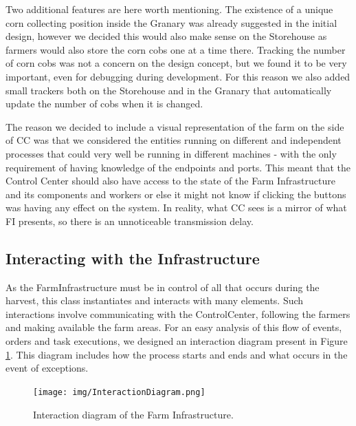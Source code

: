 \documentclass[12pt]{article}
\begin{document}
Two additional features are here worth mentioning.
The existence of a unique corn collecting position inside the Granary was already suggested in the initial design, however we decided this would also make sense
on the Storehouse as farmers would also store the corn cobs one at a time there.
Tracking the number of corn cobs was not a concern on the design concept, but we found it to be very important, even for debugging during development.
For this reason we also added small trackers both on the Storehouse and in the Granary that automatically update the number of cobs when it is changed.

The reason we decided to include a visual representation of the farm on the side of CC was that we considered the entities running on different and independent 
processes that could very well be running in different machines - with the only requirement of having knowledge of the endpoints and ports.
This meant that the Control Center should also have access to the state of the Farm Infrastructure and its components and workers or else it might not know 
if clicking the buttons was having any effect on the system.
In reality, what CC sees is a mirror of what FI presents, so there is an unnoticeable transmission delay.

\subsection{Interacting with the Infrastructure} %

As the FarmInfrastructure must be in control of all that occurs during the harvest, this class instantiates and interacts with many elements.
Such interactions involve communicating with the ControlCenter, following the farmers and making available the farm areas.
For an easy analysis of this flow of events, orders and task executions, we designed an interaction diagram present in Figure \ref{InteractionDiagram}.
This diagram includes how the process starts and ends and what occurs in the event of exceptions.

\vspace{-10pt}
\begin{figure}[H]
  \centering
  \begin{minipage}{.9\textwidth}
    \centering
    \texttt{[image: img/InteractionDiagram.png]}
  \end{minipage}%
  \caption{Interaction diagram of the Farm Infrastructure.}
  \label{InteractionDiagram}
\end{figure} 
\vspace{-10pt}
\end{document}
